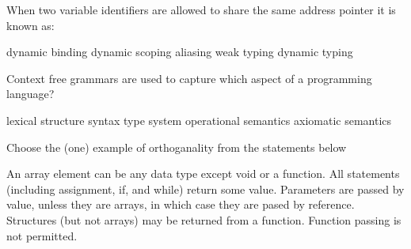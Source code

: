 \documentclass[addpoints]{exam}
\begin{document}
\begin{questions}

 \newpage

\question[2]
When two variable identifiers are allowed to share the same address pointer it is known as:\\
\begin{choices}
 \choice dynamic binding
 \choice dynamic scoping
 \choice aliasing
 \choice weak typing
 \choice dynamic typing
\end{choices}

\vspace{2em}

\question[2]
Context free grammars are used to capture which aspect of a programming language?\\
\begin{choices}
 \choice lexical structure
 \choice syntax
 \choice type system
 \choice operational semantics
 \choice axiomatic semantics
\end{choices}

\vspace{2em}

\question[2]
Choose the (one) example of orthoganality from the statements below\\
\begin{choices}
 \choice An array element can be any data type except void or a function.
 \choice All statements (including assignment, if, and while) return some value.
 \choice Parameters are passed by value, unless they are arrays, in which case they are pased by reference.
 \choice Structures (but not arrays) may be returned from a function.
 \choice Function passing is not permitted.
\end{choices}


\end{questions}
\end{document}
